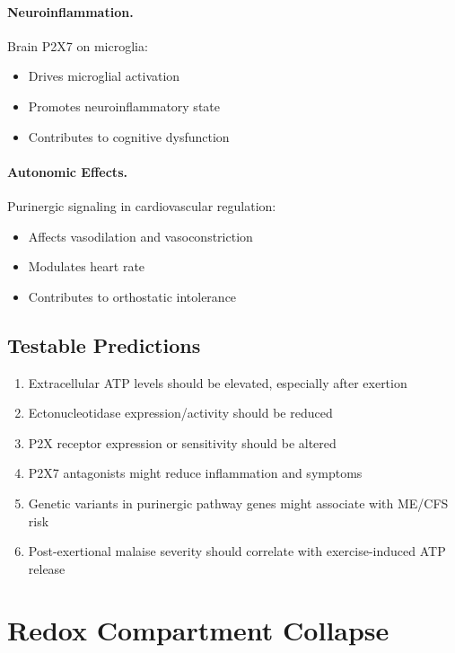 \paragraph{Neuroinflammation.} Brain P2X7 on microglia:
\begin{itemize}
    \item Drives microglial activation
    \item Promotes neuroinflammatory state
    \item Contributes to cognitive dysfunction
\end{itemize}

\paragraph{Autonomic Effects.} Purinergic signaling in cardiovascular regulation:
\begin{itemize}
    \item Affects vasodilation and vasoconstriction
    \item Modulates heart rate
    \item Contributes to orthostatic intolerance
\end{itemize}

\subsection{Testable Predictions}

\begin{enumerate}
    \item Extracellular ATP levels should be elevated, especially after exertion
    \item Ectonucleotidase expression/activity should be reduced
    \item P2X receptor expression or sensitivity should be altered
    \item P2X7 antagonists might reduce inflammation and symptoms
    \item Genetic variants in purinergic pathway genes might associate with ME/CFS risk
    \item Post-exertional malaise severity should correlate with exercise-induced ATP release
\end{enumerate}


\section{Redox Compartment Collapse}
\label{sec:redox-compartment}

